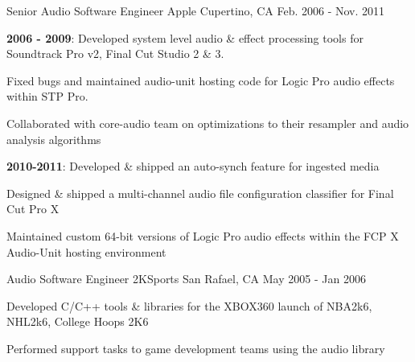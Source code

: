 \begin{cventries}
  \cventry
    {Senior Audio Software Engineer} %
    {Apple} %
    {Cupertino, CA} %
    {Feb. 2006 - Nov. 2011} %
    {
      \begin{cvitems} %
        \item {\textbf{2006 - 2009}: Developed system level audio \& effect processing tools for Soundtrack Pro v2, Final Cut Studio 2 \& 3}. 
        \item {Fixed bugs and maintained audio-unit hosting code for Logic Pro audio effects within STP Pro.}
        \item {Collaborated with core-audio team on optimizations to their resampler and audio analysis algorithms}
        \item {\textbf{2010-2011}: Developed \& shipped an auto-synch feature for ingested media}
        \item {Designed \& shipped a multi-channel audio file configuration classifier for Final Cut Pro X}        
		\item {Maintained custom 64-bit versions of Logic Pro audio effects within the FCP X Audio-Unit hosting environment}
      \end{cvitems}
    }

  \cventry
    {Audio Software Engineer} %
    {2KSports} %
    {San Rafael, CA} %
    {May 2005 - Jan 2006} %
    {
      \begin{cvitems} %
        \item {Developed C/C++ tools \& libraries for the XBOX360 launch of NBA2k6, NHL2k6, College Hoops 2K6}
        \item {Performed support tasks to game development teams using the audio library}
      \end{cvitems}
    }

\end{cventries}
	